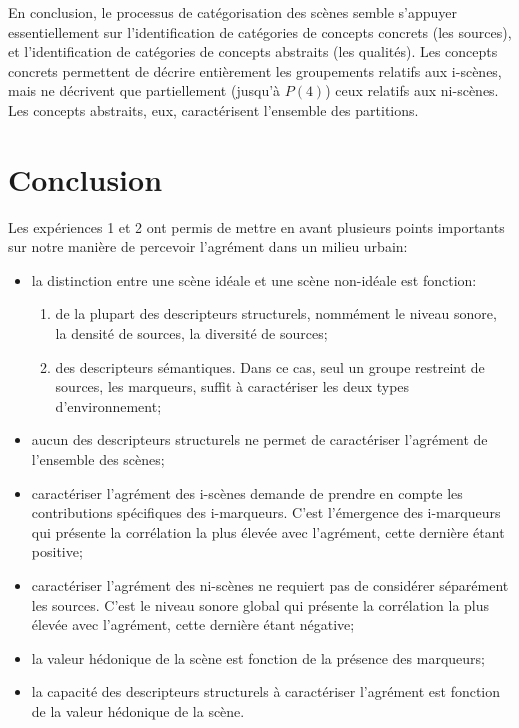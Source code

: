 En conclusion, le processus de catégorisation des scènes semble s'appuyer essentiellement sur l'identification de catégories de concepts concrets (les sources), et l'identification de catégories de concepts abstraits (les qualités). Les concepts concrets permettent de décrire entièrement les groupements relatifs aux i-scènes, mais ne décrivent que partiellement (jusqu'à $P(4)$) ceux relatifs aux ni-scènes. Les concepts abstraits, eux, caractérisent l'ensemble des partitions.


\section{Conclusion}

Les expériences 1 et 2 ont permis de mettre en avant plusieurs points importants sur notre manière de percevoir l'agrément dans un milieu urbain:

\begin{itemize}
\item la distinction entre une scène idéale et une scène non-idéale est fonction:

\begin{enumerate}
\item de la plupart des descripteurs structurels, nommément le niveau sonore, la densité de sources, la diversité de sources;
\item des descripteurs sémantiques. Dans ce cas, seul un groupe restreint de sources, les marqueurs, suffit à caractériser les deux types d'environnement;
\end{enumerate}

\item aucun des descripteurs structurels ne permet de caractériser l'agrément de l'ensemble des scènes;

\item caractériser l'agrément des i-scènes demande de prendre en compte les contributions spécifiques des i-marqueurs. C'est l'émergence des i-marqueurs qui présente la corrélation la plus élevée avec l'agrément, cette dernière étant positive;

\item caractériser l'agrément des ni-scènes ne requiert pas de considérer séparément les sources. C'est le niveau sonore global qui présente la corrélation la plus élevée avec l'agrément, cette dernière étant négative;

\item la valeur hédonique de la scène est fonction de la présence des marqueurs;

\item la capacité des descripteurs structurels à caractériser l'agrément est fonction de la valeur hédonique de la scène.
\end{itemize}

